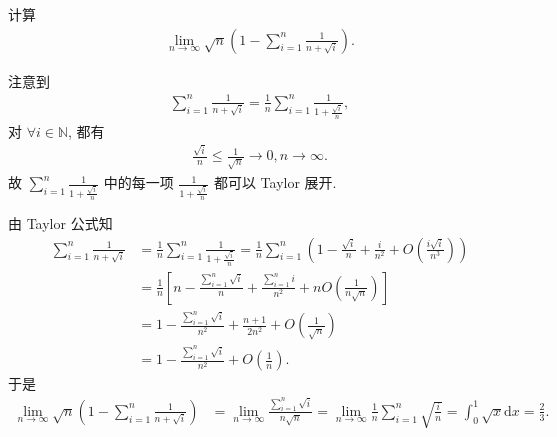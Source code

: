 \documentclass[../../main.tex]{subfiles}
\begin{document}
\begin{example}
计算
\begin{align*}
\lim_{n \to \infty} \sqrt{n} \left( 1 - \sum_{i=1}^n \frac{1}{n + \sqrt{i}} \right).
\end{align*}
\end{example}
\begin{note}
注意到
\begin{align*}
\sum_{i=1}^n \frac{1}{n + \sqrt{i}} = \frac{1}{n} \sum_{i=1}^n \frac{1}{1 + \frac{\sqrt{i}}{n}},
\end{align*}
对 $\forall i \in \mathbb{N}$, 都有
\begin{align*}
\frac{\sqrt{i}}{n} \leqslant \frac{1}{\sqrt{n}} \rightarrow 0, n \rightarrow \infty.
\end{align*}
故 $\sum_{i=1}^n \frac{1}{1 + \frac{\sqrt{i}}{n}}$ 中的每一项 $\frac{1}{1 + \frac{\sqrt{i}}{n}}$ 都可以 Taylor 展开.
\end{note}
\begin{solution}
由 Taylor 公式知
\begin{align*}
\sum_{i=1}^n \frac{1}{n + \sqrt{i}} &= \frac{1}{n} \sum_{i=1}^n \frac{1}{1 + \frac{\sqrt{i}}{n}} = \frac{1}{n} \sum_{i=1}^n \left( 1 - \frac{\sqrt{i}}{n} + \frac{i}{n^2} + O\left( \frac{i\sqrt{i}}{n^3} \right) \right) \\
&= \frac{1}{n} \left[ n - \frac{\sum\limits_{i=1}^n \sqrt{i}}{n} + \frac{\sum\limits_{i=1}^n i}{n^2} + nO\left( \frac{1}{n\sqrt{n}} \right) \right] \\
&= 1 - \frac{\sum\limits_{i=1}^n \sqrt{i}}{n^2} + \frac{n + 1}{2n^2} + O\left( \frac{1}{\sqrt{n}} \right) \\
&= 1 - \frac{\sum\limits_{i=1}^n \sqrt{i}}{n^2} + O\left( \frac{1}{n} \right).
\end{align*}
于是
\begin{align*}
\lim_{n \rightarrow \infty} \sqrt{n} \left( 1 - \sum_{i=1}^n \frac{1}{n + \sqrt{i}} \right) &= \lim_{n \rightarrow \infty} \frac{\sum\limits_{i=1}^n \sqrt{i}}{n\sqrt{n}} = \lim_{n \rightarrow \infty} \frac{1}{n} \sum\limits_{i=1}^n \sqrt{\frac{i}{n}} = \int_0^1 \sqrt{x} \mathrm{d}x = \frac{2}{3}.
\end{align*}

\end{solution}
\end{document}
